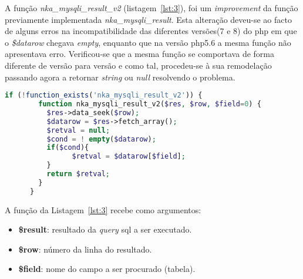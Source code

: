 A função \textit{nka\_mysqli\_result\_v2} (listagem~\ref{lst:3}), foi um \textit{improvement} da função previamente implementada \textit{nka\_mysqli\_result}. Esta alteração deveu-se ao facto de alguns erros na incompatibilidade das diferentes versões(7 e 8) do \acrshort{php} em que o \textit{\$datarow} chegava \textit{empty}, enquanto que na versão \acrshort{php}5.6 a mesma função não apresentava erro. Verificou-se que a mesma função se comportava de forma diferente de versão para versão e como tal, procedeu-se à sua remodelação passando agora a retornar \textit{string} ou \textit{null} resolvendo o problema.


\begin{lstlisting}[language={php},
                   caption={Improvement da função nka\_mysql\_result.},
                   label=lst:3]
      if (!function_exists('nka_mysqli_result_v2')) {
        function nka_mysqli_result_v2($res, $row, $field=0) {
      	  $res->data_seek($row);
      	  $datarow = $res->fetch_array();
      	  $retval = null;
      	  $cond = ! empty($datarow);
      	  if($cond){
      		    $retval = $datarow[$field];
      	  }
      	  return $retval;
      	}
      }
\end{lstlisting}

A função da Listagem~\ref{lst:3} recebe como argumentos:
\begin{itemize}
  \item \textbf{\$result}: resultado da \textit{query} \acrshort{sql} a ser executado.
  \item \textbf{\$row}: número da linha do resultado.
  \item \textbf{\$field}: nome do campo a ser procurado (tabela).
\end{itemize}


